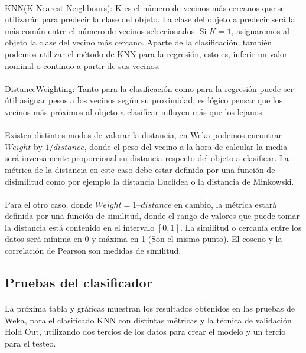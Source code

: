\documentclass[es]{ifirak}
\begin{document}
\paragraph{}
KNN(K-Nearest Neighbours): K es el número de vecinos más cercanos que se utilizarán para predecir la clase del objeto. La clase del objeto a predecir será la más común entre el número de vecinos seleccionados. Si $K = 1$, asignaremos al objeto la clase del vecino más cercano.
Aparte de la clasificación, también podemos utilizar el método de KNN para la regresión, esto es, inferir un valor nominal o continuo a partir de sus vecinos.
\paragraph{}
DistanceWeighting: Tanto para la clasificación como para la regresión puede ser útil asignar pesos a los vecinos según su proximidad, es lógico pensar que los vecinos más próximos al objeto a clasificar influyen más que los lejanos.
\paragraph{}
Existen distintos modos de valorar la distancia, en Weka podemos encontrar $Weight$ by $1/distance$, donde el peso del vecino a la hora de calcular la media será inversamente proporcional su distancia respecto del objeto a clasificar. La métrica de la distancia en este caso debe estar definida por una función de disimilitud como por ejemplo la distancia Euclídea o la distancia de Minkowski.
\paragraph{}
Para el otro caso, donde $Weight=1 – distance$ en cambio, la métrica estará definida por una función de similitud, donde el rango de valores que puede tomar la distancia está contenido en el intervalo $[0, 1]$. La similitud o cercanía entre los datos será mínima en 0 y máxima en 1 (Son el mismo punto). El coseno y la correlación de Pearson son medidas de similitud.

\subsection{Pruebas del clasificador}
\paragraph{}
La próxima tabla  y gráficas muestran los resultados obtenidos en las pruebas de Weka, para el clasificado KNN con distintas métricas y la técnica de validación Hold Out, utilizando dos tercios de los datos para crear el modelo y un tercio para el testeo.
\end{document}
